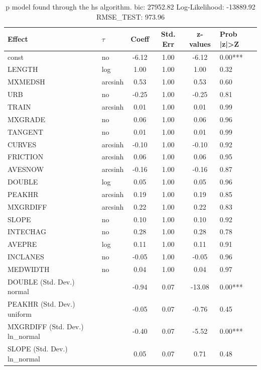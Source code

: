 \begin{table}
	\caption{p model found through the hs algorithm. bic: 27952.82 Log-Likelihood: -13889.92 RMSE_TEST: 973.96}
	\begin{center}
		\begin{tabular}{|l|l|c|c|c|l|}
			\hline
			Effect & $\tau$ & Coeff & Std. Err & z-values & Prob |z|>Z \\
			\hline
			const & no & -6.12 & 1.00 & -6.12 & 0.00*** \\
			\hline
			LENGTH & log & 1.00 & 1.00 & 1.00 & 0.32 \\
			\hline
			MXMEDSH & arcsinh & 0.53 & 1.00 & 0.53 & 0.60 \\
			\hline
			URB & no & -0.25 & 1.00 & -0.25 & 0.81 \\
			\hline
			TRAIN & arcsinh & 0.01 & 1.00 & 0.01 & 0.99 \\
			\hline
			MXGRADE & no & 0.06 & 1.00 & 0.06 & 0.96 \\
			\hline
			TANGENT & no & 0.01 & 1.00 & 0.01 & 0.99 \\
			\hline
			CURVES & arcsinh & -0.10 & 1.00 & -0.10 & 0.92 \\
			\hline
			FRICTION & arcsinh & 0.06 & 1.00 & 0.06 & 0.95 \\
			\hline
			AVESNOW & arcsinh & -0.16 & 1.00 & -0.16 & 0.87 \\
			\hline
			DOUBLE & log & 0.05 & 1.00 & 0.05 & 0.96 \\
			\hline
			PEAKHR & arcsinh & 0.19 & 1.00 & 0.19 & 0.85 \\
			\hline
			MXGRDIFF & arcsinh & 0.22 & 1.00 & 0.22 & 0.83 \\
			\hline
			SLOPE & no & 0.10 & 1.00 & 0.10 & 0.92 \\
			\hline
			INTECHAG & no & 0.28 & 1.00 & 0.28 & 0.78 \\
			\hline
			AVEPRE & log & 0.11 & 1.00 & 0.11 & 0.91 \\
			\hline
			INCLANES & no & -0.05 & 1.00 & -0.05 & 0.96 \\
			\hline
			MEDWIDTH & no & 0.04 & 1.00 & 0.04 & 0.97 \\
			\hline
			DOUBLE (Std. Dev.) normal &  & -0.94 & 0.07 & -13.08 & 0.00*** \\
			\hline
			PEAKHR (Std. Dev.) uniform &  & -0.05 & 0.07 & -0.76 & 0.45 \\
			\hline
			MXGRDIFF (Std. Dev.) ln_normal &  & -0.40 & 0.07 & -5.52 & 0.00*** \\
			\hline
			SLOPE (Std. Dev.) ln_normal &  & 0.05 & 0.07 & 0.71 & 0.48 \\

\end{tabular}
\end{center}
\end{table}
